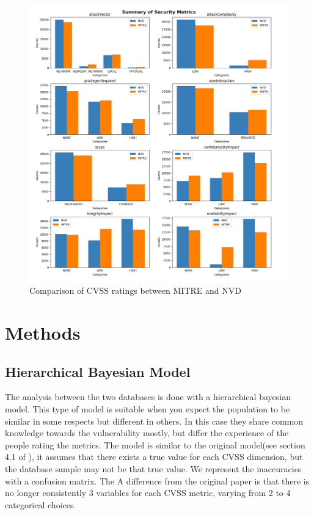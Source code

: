 \documentclass[12pt]{article}
\begin{document}
\begin{figure}
	\centering
	\includegraphics[width=1\textwidth]{figures/combined_overlap.png}
	\caption{\label{fig:counts}Comparison of CVSS ratings between MITRE and NVD}
\end{figure}

\section{Methods}

\subsection{Hierarchical Bayesian Model}

The analysis between the two databases is done with a hierarchical bayesian model. This type of
model is suitable when you expect the population to be similar in some respects but different in
others. In this case they share common knowledge towards the vulnerability mostly, but differ the
experience of the people rating the metrics.\cite{bayes} The model is similar to the original
model(see section 4.1 of \cite{bayes}), it assumes that there exists a true value for each CVSS
dimension, but the database sample may not be that true value. We represent the inaccuracies with a
confusion matrix. The A difference from the original paper is that there is no longer consistently 3
variables for each CVSS metric, varying from 2 to 4 categorical choices. \\
\end{document}

